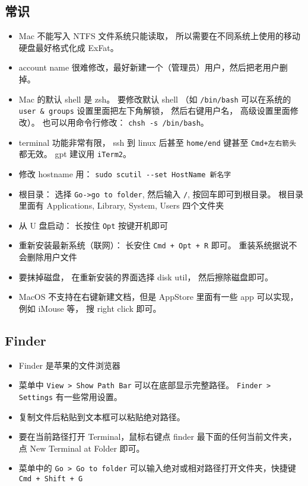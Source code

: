 \subsection{常识}
\begin{itemize}
\item Mac 不能写入 NTFS 文件系统只能读取， 所以需要在不同系统上使用的移动硬盘最好格式化成 ExFat。
\item account name 很难修改，最好新建一个（管理员）用户，然后把老用户删掉。
\item Mac 的默认 shell 是 zsh。 要修改默认 shell （如 \verb|/bin/bash| 可以在系统的 \verb|user & groups| 设置里面把左下角解锁， 然后右键用户名， 高级设置里面修改）。 也可以用命令行修改： \verb|chsh -s /bin/bash|。
\item terminal 功能非常有限， ssh 到 linux 后甚至 \verb|home/end| 键甚至 \verb|Cmd+左右箭头| 都无效。 gpt 建议用 \verb|iTerm2|。
\item 修改 hostname 用： \verb|sudo scutil --set HostName 新名字|
\item 根目录： 选择 \verb|Go->go to folder|, 然后输入 \verb|/|, 按回车即可到根目录。 根目录里面有 Applications, Library, System, Users 四个文件夹
\item 从 U 盘启动： 长按住 \verb`Opt` 按键开机即可
\item 重新安装最新系统（联网）： 长安住 \verb|Cmd + Opt + R| 即可。 重装系统据说不会删除用户文件
\item 要抹掉磁盘， 在重新安装的界面选择 disk util， 然后擦除磁盘即可。
\item MacOS 不支持在右键新建文档，但是 AppStore 里面有一些 app 可以实现， 例如 iMouse 等， 搜 right click 即可。
\end{itemize}

\subsection{Finder}
\begin{itemize}
\item Finder 是苹果的文件浏览器
\item 菜单中 \verb|View > Show Path Bar| 可以在底部显示完整路径。 \verb`Finder > Settings` 有一些常用设置。
\item 复制文件后粘贴到文本框可以粘贴绝对路径。
\item 要在当前路径打开 Terminal，鼠标右键点 finder 最下面的任何当前文件夹，点 New Terminal at Folder 即可。
\item 菜单中的 \verb`Go > Go to folder` 可以输入绝对或相对路径打开文件夹，快捷键 \verb`Cmd + Shift + G`
\end{itemize}

